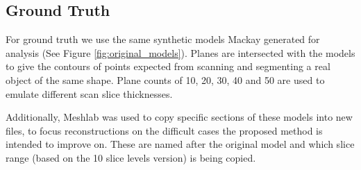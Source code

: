 \documentclass[11p, titlepage]{article}
\begin{document}
\subsection{Ground Truth}

For ground truth we use the same synthetic models Mackay generated for analysis (See Figure \ref{fig:original_models}). Planes are intersected with the models to give the contours of points expected from scanning and segmenting a real object of the same shape. Plane counts of 10, 20, 30, 40 and 50 are used to emulate different scan slice thicknesses.

Additionally, Meshlab was used to copy specific sections of these models into new files, to focus reconstructions on the difficult cases the proposed method is intended to improve on. These are named after the original model and which slice range (based on the 10 slice levels version) is being copied.
\end{document}
